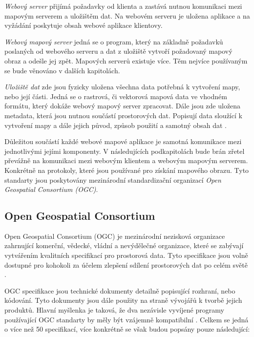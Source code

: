 \textit{Webový server} přijímá požadavky od klienta a zastává nutnou
komunikaci mezi mapovým serverem a uložištěm dat. Na webovém serveru
je uložena aplikace a na vyžádání poskytuje obsah webové aplikace
klientovy.

\textit{Webový mapový server} jedná se o program, který na základně
požadavků poslaných od webového serveru a dat z uložiště vytvoří
požadovaný mapový obraz a odešle jej zpět. Mapových serverů existuje
více. Těm nejvíce používaným se bude věnováno v dalších kapitolách.

\textit{Uložiště dat} zde jsou fyzicky uložena všechna data potřebná k
vytvoření mapy, nebo její části. Jedná se o rastrová, či vektorová
mapová data ve vhodném formátu, který dokáže webový mapový server
zpracovat. Dále jsou zde uložena metadata, která jsou nutnou součástí
prostorových dat. Popisují data sloužící k vytvoření mapy a dále
jejich původ, způsob použití a samotný obsah dat \cite{web_mapping}.

Důležitou součástí každé webové mapové aplikace je samotná komunikace
mezi jednotlivými jejími komponenty. V následujících podkapitolách
bude brán zřetel převážně na komunikaci mezi webovým klientem a
webovým mapovým serverem. Konkrétně na protokoly, které jsou používané
pro získání mapového obrazu. Tyto standarty jsou poskytovány
mezinárodní standardizační organizací \textit{Open Geospatial
  Consortium (OGC)}.

\subsection{Open Geospatial Consortium}

Open Geospatial Consortium (OGC) je mezinárodní nezisková organizace
zahrnující komerční, vědecké, vládní a nevýdělečné organizace, které
se zabývají vytvářením kvalitních specifikací pro prostorová
data. Tyto specifikace jsou volně dostupné pro kohokoli za účelem
zlepšení sdílení prostorových dat po celém světě \cite{oqc_web}.

OGC specifikace jsou technické dokumenty detailně popisující rozhraní,
nebo kódování. Tyto dokumenty jsou dále použity na straně vývojářů k
tvorbě jejich produktů. Hlavní myšlenka je taková, že dva nezávisle
vyvíjené programy používající OGC standarty by měly být vzájemně
kompatibilní \cite{oqc_web}. Celkem se jedná o více než 50
specifikací, více konkrétně se však budou popsány pouze následující:

